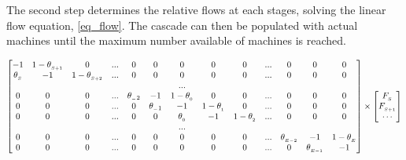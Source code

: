 The second step determines the relative flows at each stages, solving the linear
flow equation, \eqref{eq_flow}.
The cascade can then be populated with actual machines until the maximum number
available of machines is reached.

\begin{equation}
\setcounter{MaxMatrixCols}{20}
\begin{bmatrix}
     -1      & 1-\theta_{_{S+1}} & 0                 & ...  & 0            & 0            & 0             & 0             & 0             & ... & 0               & 0  & 0 \\
\theta_{_S}  & -1                & 1-\theta_{_{S+2}} & ...  & 0            & 0            & 0             & 0             & 0             & ... & 0               & 0  & 0 \\
             &                   &                   &      &              &              & ...           &               &               &     &                 &    &   \\
 0           & 0                 & 0                 & ...  & \theta_{_-2} & -1           & 1-\theta_{_0} & 0             & 0             & ... & 0               & 0  & 0 \\
 0           & 0                 & 0                 & ...  & 0            & \theta_{_-1} & -1            & 1-\theta_{_1} & 0             & ... & 0               & 0  & 0 \\
 0           & 0                 & 0                 & ...  & 0            & 0            & \theta_{_0}   & -1            & 1-\theta_{_2} & ... & 0               & 0  & 0 \\
             &                   &                   &      &              &              & ...           &               &               &     &                 &    &   \\
 0           & 0                 & 0                 & ...  & 0            & 0            & 0             & 0             & 0             & ... & \theta_{_{E-2}} & -1 & 1-\theta_{_E} \\
 0           & 0                 & 0                 & ...  & 0            & 0            & 0             & 0             & 0             & ... & 0               & \theta_{_{E-1}} & -1
 \end{bmatrix}
 \times
 \begin{bmatrix}
     F_{_{S}}   \\
     F_{_{S+1}} \\
     \cdots     \\

\end{bmatrix}
\end{equation}
